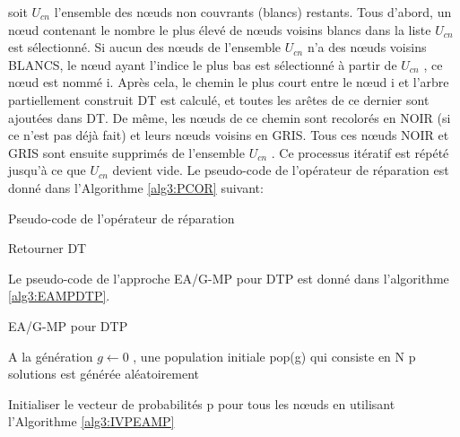 \begin{enumerate}[label=\alph*)]
soit $U_{cn}$ l’ensemble des nœuds non couvrants (blancs) restants. Tous d’abord, un nœud contenant le nombre  le plus élevé de nœuds voisins blancs dans la liste $U_{cn}$ est sélectionné. Si aucun des nœuds de l’ensemble $U_{cn}$ n’a des nœuds voisins BLANCS, le nœud ayant l’indice le plus bas est sélectionné à partir de $U_{cn}$ , ce nœud est nommé i. Après cela, le chemin le plus court entre le nœud i et l’arbre partiellement construit DT est calculé, et toutes les arêtes de ce dernier sont ajoutées dans DT. De même, les nœuds de ce chemin sont recolorés en NOIR (si ce n’est pas déjà fait) et leurs nœuds voisins en GRIS. Tous ces nœuds NOIR et GRIS sont ensuite supprimés de l’ensemble $U_{cn}$ . Ce processus itératif  est répété jusqu’à ce que $U_{cn}$ devient vide. Le pseudo-code de l’opérateur de réparation est donné dans l’Algorithme \ref{alg3:PCOR} suivant:

\begin{algorithm}[H]
\label{alg3:PCOR}
\caption{Pseudo-code de l’opérateur de réparation}
\SetAlgoLined
\DontPrintSemicolon
\large



Retourner DT \;

\end{algorithm}


Le pseudo-code de l’approche EA/G-MP pour DTP est donné dans l'algorithme \ref{alg3:EAMPDTP}.\\

\begin{algorithm}[H]
\label{alg3:EAMPDTP}
\caption{EA/G-MP pour DTP}
\SetAlgoLined
\DontPrintSemicolon
\large

A la génération $g \gets 0 $ , une population initiale pop(g) qui consiste en N p solutions est générée aléatoirement \;

Initialiser le vecteur de probabilités p pour tous les nœuds en utilisant l’Algorithme \ref{alg3:IVPEAMP} \;

\end{algorithm}
\end{enumerate}
